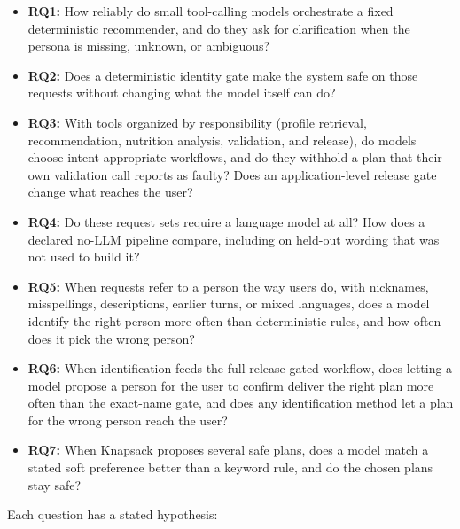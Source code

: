 \documentclass[
  10pt,
  letterpaper,
]{article}
\providecommand{\tightlist}{%
  \setlength{\itemsep}{0pt}\setlength{\parskip}{0pt}}
\begin{document}
\begin{itemize}
\tightlist
\item
  \textbf{RQ1:} How reliably do small tool-calling models orchestrate a
  fixed deterministic recommender, and do they ask for clarification
  when the persona is missing, unknown, or ambiguous?
\item
  \textbf{RQ2:} Does a deterministic identity gate make the system safe
  on those requests without changing what the model itself can do?
\item
  \textbf{RQ3:} With tools organized by responsibility (profile
  retrieval, recommendation, nutrition analysis, validation, and
  release), do models choose intent-appropriate workflows, and do they
  withhold a plan that their own validation call reports as faulty? Does
  an application-level release gate change what reaches the user?
\item
  \textbf{RQ4:} Do these request sets require a language model at all?
  How does a declared no-LLM pipeline compare, including on held-out
  wording that was not used to build it?
\item
  \textbf{RQ5:} When requests refer to a person the way users do, with
  nicknames, misspellings, descriptions, earlier turns, or mixed
  languages, does a model identify the right person more often than
  deterministic rules, and how often does it pick the wrong person?
\item
  \textbf{RQ6:} When identification feeds the full release-gated
  workflow, does letting a model propose a person for the user to
  confirm deliver the right plan more often than the exact-name gate,
  and does any identification method let a plan for the wrong person
  reach the user?
\item
  \textbf{RQ7:} When Knapsack proposes several safe plans, does a model
  match a stated soft preference better than a keyword rule, and do the
  chosen plans stay safe?
\end{itemize}

Each question has a stated hypothesis:
\end{document}
